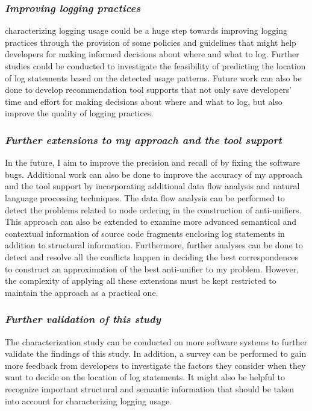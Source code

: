 \subsubsection{ \emph{Improving logging practices} }
characterizing logging usage could be a huge step towards improving logging practices through the provision of some policies and guidelines that might help developers for making informed decisions about where and what to log. Further studies could be conducted to investigate the feasibility of predicting the location of log statements based on the detected usage patterns. Future work can also be done to develop recommendation tool supports that not only save developers’ time and effort for making decisions about where and what to log, but also improve the quality of logging practices.
\subsubsection{\emph{Further extensions to my approach and the tool support} }
In the future, I aim to improve the precision and recall of  by fixing the software bugs. Additional work can also be done to improve the accuracy of my approach and the tool support by incorporating additional data flow analysis and natural language processing techniques. The data flow analysis can be performed to detect the problems related to node ordering in the  construction of anti-unifiers. This approach can also be extended to examine more advanced semantical and contextual information of source code fragments enclosing log statements in addition to structural information. Furthermore, further analyses can be done to detect and resolve all the conflicts happen in deciding the best correspondences to construct an approximation of the best anti-unifier to my problem. However, the complexity of applying all these extensions must be kept restricted to maintain the approach as a practical one.

\subsubsection{\emph{Further validation of this study}} 
The characterization study can be conducted on more software systems to further validate the findings of this study. In addition, a survey can be performed to gain more feedback from developers to investigate the factors they consider when they want to decide on the location of log statements. It might also be helpful to recognize important structural and semantic information that should be taken into account for characterizing logging usage.

